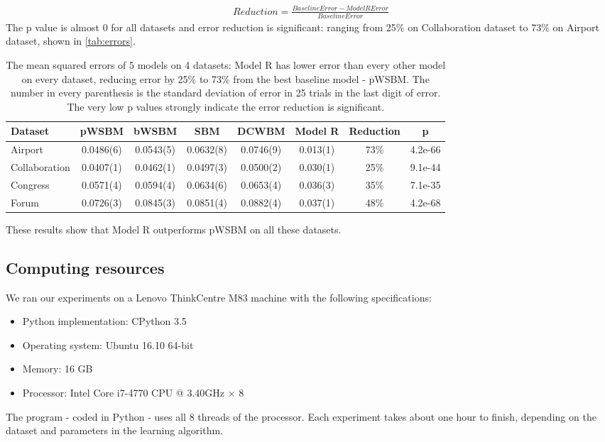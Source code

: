 \documentclass[letterpaper]{article}
\begin{document}
\begin{align*}
Reduction = \frac{BaselineError - ModelRError}{BaselineError}
\end{align*}
The p value is almost 0 for all datasets and error reduction is significant:
ranging from 25\% on Collaboration dataset to 73\% on Airport dataset,
shown in \autoref{tab:errors}.
\begin{table}[!htb]
	\centering
	\caption{
		The mean squared errors of 5 models on 4 datasets:
		Model R has lower error than every other model on every dataset,
		reducing error by 25\% to 73\% from the best baseline model - pWSBM.
		The number in every parenthesis is the standard deviation of error in 25 trials in the last digit of error. The very low p values strongly indicate the error reduction is significant.
	}
	\begin{tabularx}{\textwidth}{|X|c|c|c|c|c|c|c|} \hline \rowcolor{blue!50}
		Dataset & pWSBM & bWSBM & SBM & DCWBM & Model R & Reduction & p \\ \hline
		Airport & 0.0486(6) & 0.0543(5) & 0.0632(8) & 0.0746(9) & 0.013(1) & 73\% & 4.2e-66 \\ \hline
		Collaboration & 0.0407(1) & 0.0462(1) & 0.0497(3) & 0.0500(2) & 0.030(1) & 25\% & 9.1e-44 \\ \hline
		Congress & 0.0571(4) & 0.0594(4) & 0.0634(6) & 0.0653(4) & 0.036(3) & 35\% & 7.1e-35 \\ \hline
		Forum & 0.0726(3) & 0.0845(3) & 0.0851(4) & 0.0882(4) & 0.037(1) & 48\% & 4.2e-68 \\ \hline
	\end{tabularx}
	\label{tab:errors}
\end{table}
These results show that Model R outperforms pWSBM on all these datasets.

\subsection{Computing resources}
We ran our experiments on a Lenovo ThinkCentre M83 machine with the following specifications:
\begin{itemize}
	\item Python implementation: CPython 3.5
	\item Operating system: Ubuntu 16.10 64-bit
	\item Memory: 16 GB
	\item Processor: Intel Core i7-4770 CPU @ 3.40GHz $ \times $ 8
\end{itemize}
The program - coded in Python - uses all 8 threads of the processor.
Each experiment takes about one hour to finish,
depending on the dataset and parameters in the learning algorithm.



\end{document}
